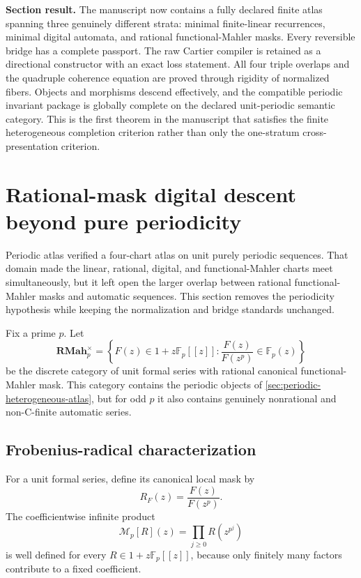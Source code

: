 \documentclass[11pt]{article}
\theoremstyle{definition}
\theoremstyle{remark}
\newcommand{\RMah}{\mathbf{RMah}}
\begin{document}
\begin{resultbox}
\textbf{Section result.}
The manuscript now contains a fully declared finite atlas spanning three genuinely different strata: minimal finite-linear recurrences, minimal digital automata, and rational functional-Mahler masks.  Every reversible bridge has a complete passport.  The raw Cartier compiler is retained as a directional constructor with an exact loss statement.  All four triple overlaps and the quadruple coherence equation are proved through rigidity of normalized fibers.  Objects and morphisms descend effectively, and the compatible periodic invariant package is globally complete on the declared unit-periodic semantic category.  This is the first theorem in the manuscript that satisfies the finite heterogeneous completion criterion rather than only the one-stratum cross-presentation criterion.
\end{resultbox}


\section{Rational-mask digital descent beyond pure periodicity}
\label{sec:rational-mask-digital-atlas}

Periodic atlas verified a four-chart atlas on unit purely periodic sequences.  That domain made the linear, rational, digital, and functional-Mahler charts meet simultaneously, but it left open the larger overlap between rational functional-Mahler masks and automatic sequences.  This section removes the periodicity hypothesis while keeping the normalization and bridge standards unchanged.

Fix a prime \(p\).  Let
\[
\RMah_p^{\times}
=
\left\{
F(z)\in 1+z\mathbb F_p[[z]]:
\frac{F(z)}{F(z^p)}\in\mathbb F_p(z)
\right\}
\]
be the discrete category of unit formal series with rational canonical functional-Mahler mask.  This category contains the periodic objects of \cref{sec:periodic-heterogeneous-atlas}, but for odd \(p\) it also contains genuinely nonrational and non-C-finite automatic series.

\subsection{Frobenius-radical characterization}

For a unit formal series, define its canonical local mask by
\begin{equation}
\label{eq:block04-canonical-mask}
R_F(z)
=
\frac{F(z)}{F(z^p)}.
\end{equation}
The coefficientwise infinite product
\begin{equation}
\label{eq:block04-mask-product}
\mathcal M_p[R](z)
=
\prod_{j\geq 0}R\!\left(z^{p^j}\right)
\end{equation}
is well defined for every \(R\in1+z\mathbb F_p[[z]]\), because only finitely many factors contribute to a fixed coefficient.
\end{document}
